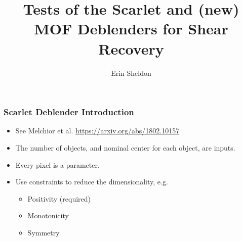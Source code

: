 \documentclass{beamer}
\title{Tests of the Scarlet and (new) MOF Deblenders for Shear Recovery}
\author{Erin Sheldon}
\institute{Brookhaven National Laboratory}
\begin{document}
\frame{\titlepage}



\frame
{
    \frametitle{Scarlet Deblender Introduction}

    \begin{itemize}

        \item See Melchior et al. \url{https://arxiv.org/abs/1802.10157 }

        \item The number of objects, and nominal center for each object, are inputs.

        \item Every pixel is a parameter.


        \item Use constraints to reduce the dimensionality, e.g.
        \begin{itemize}
            \item Positivity (required)
            \item Monotonicity
            \item Symmetry
        \end{itemize}

    \end{itemize}

}
\end{document}
